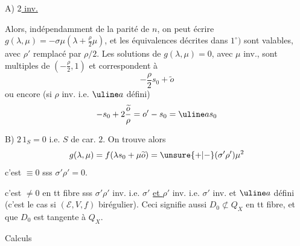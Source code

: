 A) \uline{$2$ inv.}

Alors, indépendamment de la parité de $n$, on peut écrire
$g(\lambda,\mu)=-\sigma\mu(\lambda+\frac{\rho}{2}\mu)$,
et les équivalences décrites dans $1^\circ)$ sont valables,
avec $\rho'$ remplacé par $\rho/2$.
Les solutions de $g(\lambda,\mu)=0$, avec $\mu$ inv.,
sont multiples de $(-\frac{\rho}{2},1)$ et correspondent à
\[
-\frac{\rho}{2}s_0+\widetilde o
\]
ou encore 
(si $\rho$ inv. i.e. $\uline a$ défini)
\[
-s_0+2\frac{\widetilde o}{\rho}=o'-s_0=\uline a s_0
\]

B) $2\,1_S=0$ i.e. $S$ de car. $2$.
On trouve alors 
\[
g(\lambda,\mu)=f(\lambda s_0+\mu\widetilde o)
=\unsure{+|-}(\sigma'\rho')\mu^2
\]
c'est $\equiv0$ sss $\sigma'\rho'=0$.

c'est $\neq0$ en tt fibre sss $\sigma'\rho'$ inv.
i.e. $\sigma'$ \uline{et $\rho'$} inv.
i.e. $\sigma'$ inv. et $\uline a$ défini
(c'est le cas si $(\mathcal E,V,f)$ birégulier).
 Ceci signifie aussi
$D_0\not\subset Q_X$ en tt fibre, et  que
$D_0$ est tangente à $Q_X$.


Calculs 

